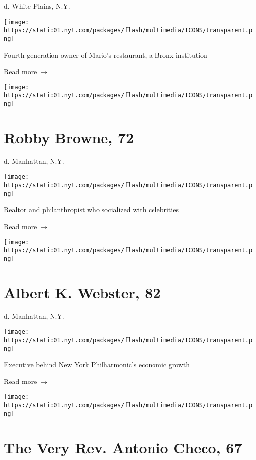 d. White Plains, N.Y.

\texttt{[image: https://static01.nyt.com/packages/flash/multimedia/ICONS/transparent.png]}

Fourth-generation owner of Mario's restaurant, a Bronx institution

 Read more~→

\href{https://www.nytimes.com/2020/04/14/realestate/luxury/robby-browne-dead-coronavirus.html}{}

\texttt{[image: https://static01.nyt.com/packages/flash/multimedia/ICONS/transparent.png]}

\hypertarget{robby-browne-72}{%
\section{Robby Browne, 72}\label{robby-browne-72}}

d. Manhattan, N.Y.

\texttt{[image: https://static01.nyt.com/packages/flash/multimedia/ICONS/transparent.png]}

Realtor and philanthropist who socialized with celebrities

 Read more~→

\href{https://www.nytimes.com/2020/04/14/obituaries/albert-webster-dead-coronavirus.html}{}

\texttt{[image: https://static01.nyt.com/packages/flash/multimedia/ICONS/transparent.png]}

\hypertarget{albert-k-webster-82}{%
\section{Albert K. Webster, 82}\label{albert-k-webster-82}}

d. Manhattan, N.Y.

\texttt{[image: https://static01.nyt.com/packages/flash/multimedia/ICONS/transparent.png]}

Executive behind New York Philharmonic's economic growth

 Read more~→

\href{https://www.nytimes.com/2020/04/14/nyregion/antonio-checo-episcopal-priest-who-stressed-service-dies-at-67.html}{}

\texttt{[image: https://static01.nyt.com/packages/flash/multimedia/ICONS/transparent.png]}

\hypertarget{the-very-rev-antonio-checo-67}{%
\section{The Very Rev. Antonio Checo,
67}\label{the-very-rev-antonio-checo-67}}

